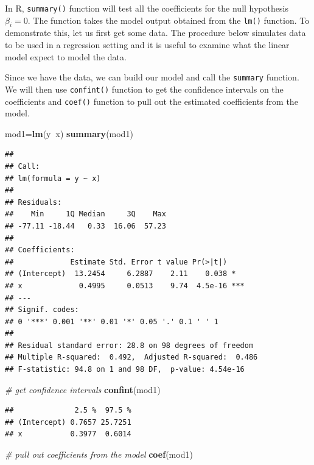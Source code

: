 \documentclass[12pt,]{krantz}
\newenvironment{Shaded}{\begin{snugshade}}{\end{snugshade}}
\newcommand{\CommentTok}[1]{\textcolor[rgb]{0.56,0.35,0.01}{\textit{#1}}}
\newcommand{\KeywordTok}[1]{\textcolor[rgb]{0.13,0.29,0.53}{\textbf{#1}}}
\newcommand{\NormalTok}[1]{#1}
\newcommand{\OperatorTok}[1]{\textcolor[rgb]{0.81,0.36,0.00}{\textbf{#1}}}
\begin{document}
In R, \texttt{summary()} function will test all the coefficients for the null hypothesis
\(\beta_i=0\). The function takes the model output obtained from the \texttt{lm()}
function. To demonstrate this, let us first get some data. The procedure below
simulates data to be used in a regression setting and it is useful to examine
what the linear model expect to model the data.

Since we have the data, we can build our model and call the \texttt{summary} function.
We will then use \texttt{confint()} function to get the confidence intervals on the
coefficients and \texttt{coef()} function to pull out the estimated coefficients from
the model.

\begin{Shaded}
\begin{Highlighting}[]
\NormalTok{mod1=}\KeywordTok{lm}\NormalTok{(y}\OperatorTok{~}\NormalTok{x)}
\KeywordTok{summary}\NormalTok{(mod1)}
\end{Highlighting}
\end{Shaded}

\begin{verbatim}
## 
## Call:
## lm(formula = y ~ x)
## 
## Residuals:
##    Min     1Q Median     3Q    Max 
## -77.11 -18.44   0.33  16.06  57.23 
## 
## Coefficients:
##             Estimate Std. Error t value Pr(>|t|)    
## (Intercept)  13.2454     6.2887    2.11    0.038 *  
## x             0.4995     0.0513    9.74  4.5e-16 ***
## ---
## Signif. codes:  
## 0 '***' 0.001 '**' 0.01 '*' 0.05 '.' 0.1 ' ' 1
## 
## Residual standard error: 28.8 on 98 degrees of freedom
## Multiple R-squared:  0.492,  Adjusted R-squared:  0.486 
## F-statistic: 94.8 on 1 and 98 DF,  p-value: 4.54e-16
\end{verbatim}

\begin{Shaded}
\begin{Highlighting}[]
\CommentTok{# get confidence intervals }
\KeywordTok{confint}\NormalTok{(mod1)}
\end{Highlighting}
\end{Shaded}

\begin{verbatim}
##              2.5 %  97.5 %
## (Intercept) 0.7657 25.7251
## x           0.3977  0.6014
\end{verbatim}

\begin{Shaded}
\begin{Highlighting}[]
\CommentTok{# pull out coefficients from the model}
\KeywordTok{coef}\NormalTok{(mod1)}
\end{Highlighting}
\end{Shaded}
\end{document}
